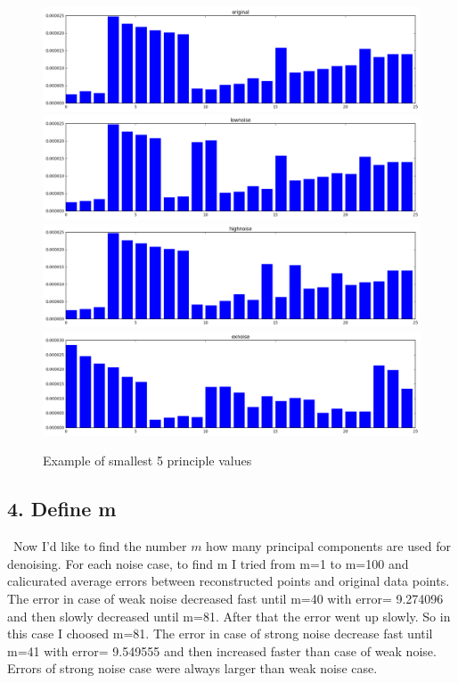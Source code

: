\documentclass[a4paper,11pt]{article}
\begin{document}
\begin{figure}[htbp]
  \includegraphics[scale=0.4]{orgev2.png}
  \includegraphics[scale=0.4]{lowev2.png}
  \includegraphics[scale=0.4]{stev2.png}
  \includegraphics[scale=0.4]{exev2.png}
   \caption{Example of smallest 5 principle values}
\end{figure}
\subsection*{4. Define m}
~Now I'd like to find the number $m$ how many principal components are used for denoising. For each noise case, to find m I tried from m=1 to m=100 and calicurated average errors between reconstructed points and original data points. The error in case of weak noise decreased fast until m=40 with error= 9.274096 and then slowly decreased until m=81. After that the error went up slowly. So in this case I choosed m=81. The error in case of strong noise decrease fast until m=41 with error= 9.549555 and then increased faster than case of weak noise. Errors of strong noise case were always larger than weak noise case.
\end{document}
